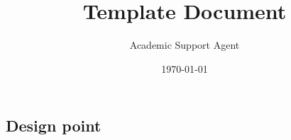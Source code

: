\documentclass{article}
\title{Template Document}
\author{Academic Support Agent}
\date{\today}
\begin{document}
\maketitle


\newpage







\printbibliography




\begin{appendices}
    
    \section{Design point}
    \label{DesignPointAppendix}

    
    


\end{appendices}
\end{document}
